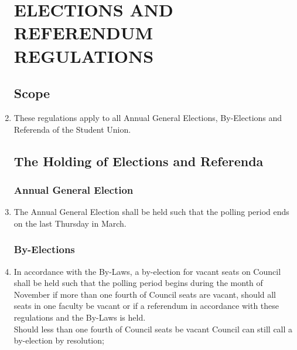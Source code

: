\documentclass[oneside]{book}
\begin{document}
\begin{enumerate}
\part{\label{ELECTIONS_AND_REFERENDUM_REGULATIONS}ELECTIONS AND REFERENDUM
REGULATIONS }
\chapter{\label{Elections_Scope}Scope }
\item These regulations apply to all Annual General Elections, By-Elections
and Referenda of the Student Union. 

\chapter{\label{The_Holding_of_Elections_and_Referenda}The Holding of Elections
and Referenda }


\section{\label{Annual_General_Election}Annual General Election }
\item The Annual General Election shall be held such that the polling period
ends on the last Thursday in March. 

\section{\label{By-Elections}By-Elections }
\item In accordance with the By-Laws, a by-election for vacant seats on
Council shall be held such that the polling period begins during the
month of November if more than one fourth of Council seats are vacant,
should all seats in one faculty be vacant or if a referendum in accordance
with these regulations and the By-Laws is held. \\
Should less than one fourth of Council seats be vacant Council can
still call a by-election by resolution; 


\end{enumerate}
\end{document}
